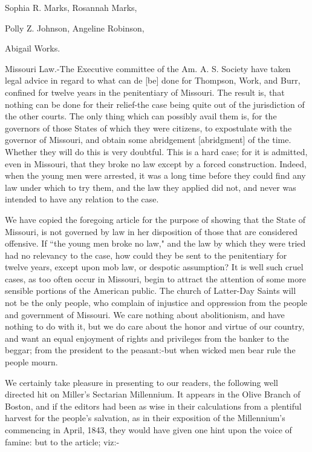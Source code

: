 Sophia R. Marks, Rosannah Marks,

Polly Z. Johnson, Angeline Robinson,

Abigail Works.

Missouri Law.-The Executive committee of the Am. A. S. Society have taken legal
advice in regard to what can de [be] done for Thompson, Work, and Burr, confined for
twelve years in the penitentiary of Missouri. The result is, that nothing can be done
for their relief-the case being quite out of the jurisdiction of the other courts.
The only thing which can possibly avail them is, for the governors of those States of
which they were citizens, to expostulate with the governor of Missouri, and obtain
some abridgement [abridgment] of the time. Whether they will do this is very
doubtful. This is a hard case; for it is admitted, even in Missouri, that they broke
no law except by a forced construction. Indeed, when the young men were arrested, it
was a long time before they could find any law under which to try them, and the law
they applied did not, and never was intended to have any relation to the
case.

We have copied the foregoing article for the purpose of showing that the State of
Missouri, is not governed by law in her disposition of those that are considered
offensive. If ``the young men broke no law," and the law by which they were tried had
no relevancy to the case, how could they be sent to the penitentiary for twelve
years, except upon mob law, or despotic assumption? It is well such cruel cases, as
too often occur in Missouri, begin to attract the attention of some more sensible
portions of the American public. The church of Latter-Day Saints will not be the only
people, who complain of injustice and oppression from the people and government of
Missouri. We care nothing about abolitionism, and have nothing to do with it, but we
do care about the honor and virtue of our country, and want an equal enjoyment of
rights and privileges from the banker to the beggar; from the president to the
peasant:-but when wicked men bear rule the people mourn.

We certainly take pleasure in presenting to our readers, the following well directed
hit on Miller's Sectarian Millennium. It appears in the Olive Branch of Boston, and
if the editors had been as wise in their calculations from a plentiful harvest for
the people's salvation, as in their exposition of the Millennium's commencing in
April, 1843, they would have given one hint upon the voice of famine: but to the
article; viz:-

